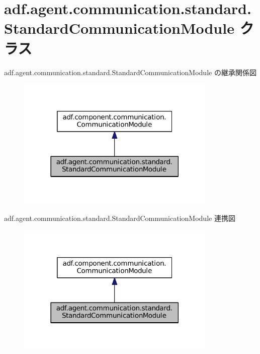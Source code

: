 \hypertarget{classadf_1_1agent_1_1communication_1_1standard_1_1StandardCommunicationModule}{}\section{adf.\+agent.\+communication.\+standard.\+Standard\+Communication\+Module クラス}
\label{classadf_1_1agent_1_1communication_1_1standard_1_1StandardCommunicationModule}


adf.\+agent.\+communication.\+standard.\+Standard\+Communication\+Module の継承関係図
\nopagebreak
\begin{figure}[H]
\begin{center}
\leavevmode
\includegraphics[width=270pt]{classadf_1_1agent_1_1communication_1_1standard_1_1StandardCommunicationModule__inherit__graph}
\end{center}
\end{figure}


adf.\+agent.\+communication.\+standard.\+Standard\+Communication\+Module 連携図
\nopagebreak
\begin{figure}[H]
\begin{center}
\leavevmode
\includegraphics[width=270pt]{classadf_1_1agent_1_1communication_1_1standard_1_1StandardCommunicationModule__coll__graph}
\end{center}
\end{figure}
